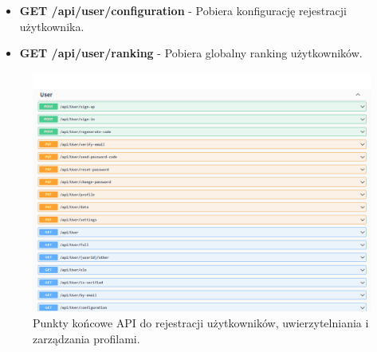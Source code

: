 \documentclass[12pt,a4paper]{article}
\begin{document}
\begin{itemize}
\begin{itemize}
        \item \textbf{GET /api/user/configuration} - Pobiera konfigurację rejestracji użytkownika. 
        \item \textbf{GET /api/user/ranking} - Pobiera globalny ranking użytkowników. 
    \end{itemize}
    \begin{figure}[h!]
        \centering
        \includegraphics[width=1\textwidth]{zdj/user_controller.png}
        \caption{Punkty końcowe API do rejestracji użytkowników, uwierzytelniania i zarządzania profilami.}
        
    \end{figure}

\newpage


\end{itemize}
\end{document}
